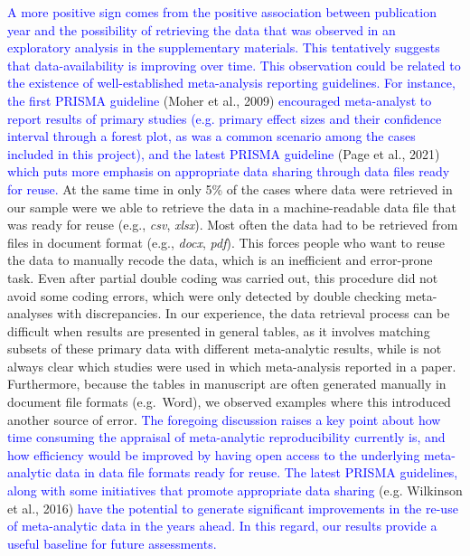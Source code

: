 \documentclass[
  ,man,floatsintext]{apa6}
\begin{document}
\textcolor{blue}{A more positive sign comes from the positive association between publication year and the possibility of retrieving the data that was observed in an exploratory analysis in the supplementary materials. This tentatively suggests that data-availability is improving over time. This observation could be related to the existence of well-established meta-analysis reporting guidelines. For instance, the first PRISMA guideline} (Moher et al., 2009) \textcolor{blue}{encouraged meta-analyst to report results of primary studies (e.g. primary effect sizes and their confidence interval through a forest plot, as was a common scenario among the cases included in this project), and the latest PRISMA guideline} (Page et al., 2021) \textcolor{blue}{which puts more emphasis on appropriate data sharing through data files ready for reuse.} At the same time in only 5\% of the cases where data were retrieved in our sample were we able to retrieve the data in a machine-readable data file that was ready for reuse (e.g., \emph{csv}, \emph{xlsx}). Most often the data had to be retrieved from files in document format (e.g., \emph{docx}, \emph{pdf}). This forces people who want to reuse the data to manually recode the data, which is an inefficient and error-prone task. Even after partial double coding was carried out, this procedure did not avoid some coding errors, which were only detected by double checking meta-analyses with discrepancies. In our experience, the data retrieval process can be difficult when results are presented in general tables, as it involves matching subsets of these primary data with different meta-analytic results, while is not always clear which studies were used in which meta-analysis reported in a paper. Furthermore, because the tables in manuscript are often generated manually in document file formats (e.g.~Word), we observed examples where this introduced another source of error. \textcolor{blue}{The foregoing discussion raises a key point about how time consuming the appraisal of meta-analytic reproducibility currently is, and how efficiency would be improved by having open access to the underlying meta-analytic data in data file formats ready for reuse. The latest PRISMA guidelines, along with some initiatives that promote appropriate data sharing} (e.g. Wilkinson et al., 2016) \textcolor{blue}{have the potential to generate significant improvements in the re-use of meta-analytic data in the years ahead. In this regard, our results provide a useful baseline for future assessments.}
\end{document}
